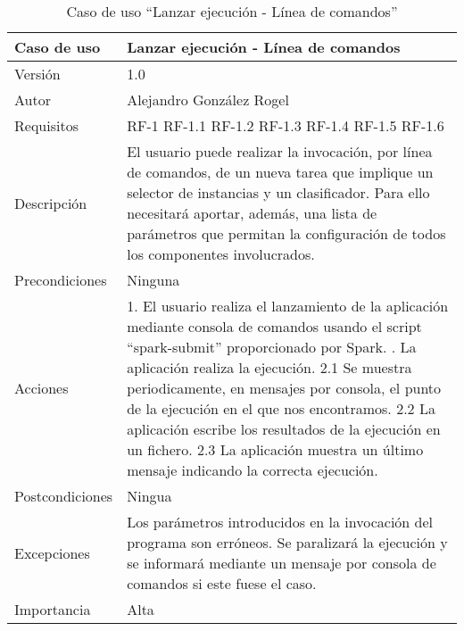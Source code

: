 \begin{table}
  \begin{center}
   \begin{tabular}{|>{} L{3cm} | L{9cm} |}
    \hline
    Caso de uso & Lanzar ejecución - Línea de comandos\\
    \hline
    Versión & 1.0 \\
    \hline
    Autor & Alejandro González Rogel \\
    \hline
    Requisitos & RF-1\newline
		RF-1.1\newline
		RF-1.2\newline
		RF-1.3\newline
		RF-1.4\newline
		RF-1.5\newline
		RF-1.6\\
    \hline
    Descripción & El usuario puede realizar la invocación, por línea de comandos, de un nueva tarea que implique un selector de instancias y un clasificador. Para ello necesitará aportar, además, una lista de parámetros que permitan la configuración de todos los componentes involucrados.\\
    \hline
    Precondiciones & Ninguna \\
    \hline
    Acciones & 1. El usuario realiza el lanzamiento de la aplicación mediante consola de comandos usando el script ``spark-submit'' proporcionado por Spark. . La aplicación realiza la ejecución. \newline
    \hspace{1em} 2.1 Se muestra periodicamente, en mensajes por consola, el punto de la ejecución en el que nos encontramos. \newline
    \hspace{1em} 2.2 La aplicación escribe los resultados de la ejecución en un fichero.\newline
    \hspace{1em} 2.3 La aplicación muestra un último mensaje indicando la correcta ejecución.\\
    \hline
    Postcondiciones & Ningua \\
    \hline
    Excepciones & Los parámetros introducidos en la invocación del programa son erróneos. Se paralizará la ejecución y se informará mediante un mensaje por consola de comandos si este fuese el caso. \\
    \hline
    Importancia & Alta \\
    \hline
   \end{tabular}
   \caption{Caso de uso ``Lanzar ejecución - Línea de comandos''}
   \label{tabla:casoUso1}
  \end{center}
 \end{table} 
 
